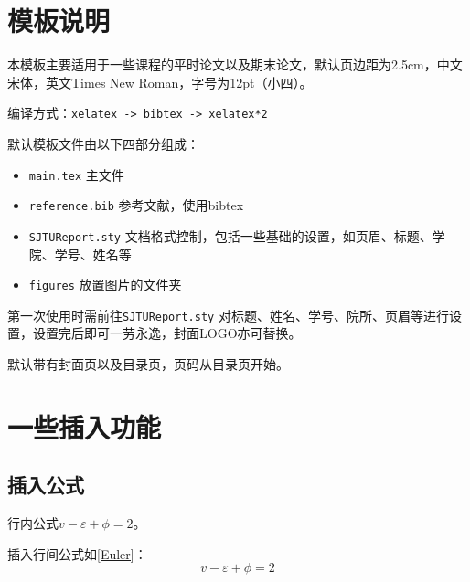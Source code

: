 \documentclass[12pt,hyperref,a4paper,UTF8]{ctexart}
\begin{document}
\cover

%
%

\thispagestyle{empty} %

\newpage
\tableofcontents

\newpage


\section{模板说明}
本模板主要适用于一些课程的平时论文以及期末论文，默认页边距为2.5cm，中文宋体，英文Times New Roman，字号为12pt（小四）。

编译方式：\verb|xelatex -> bibtex -> xelatex*2|


默认模板文件由以下四部分组成：
\begin{itemize}
    \item \texttt{main.tex} 主文件
    \item \texttt{reference.bib} 参考文献，使用bibtex
    \item \texttt{SJTUReport.sty} 文档格式控制，包括一些基础的设置，如页眉、标题、学院、学号、姓名等
    \item \texttt{figures} 放置图片的文件夹
\end{itemize}

第一次使用时需前往\texttt{SJTUReport.sty} 对标题、姓名、学号、院所、页眉等进行设置，设置完后即可一劳永逸，封面LOGO亦可替换。

默认带有封面页以及目录页，页码从目录页开始。

\section{一些插入功能}
\subsection{插入公式}
行内公式$v-\varepsilon+\phi=2$。

插入行间公式如\autoref{Euler}：
\begin{equation}
    v-\varepsilon+\phi=2
    \label{Euler}
\end{equation}
\end{document}
